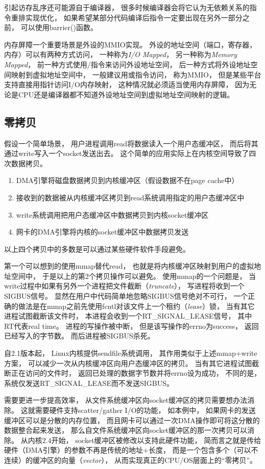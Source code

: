 \documentclass[11pt]{article}
\begin{document}
引起访存乱序还可能源自于编译器，
很多时候编译器会将它认为无依赖关系的指令重排实现优化，
如果希望某部分代码编译后指令一定要出现在另外一部分之前，
可以使用barrier()函数。

内存屏障一个重要场景是外设的MMIO实现。
外设的地址空间（端口，寄存器，内存）可以有两种方式访问，
一种称为{\em I/O Mapped}，
另一种称为{\em Memory Mapped}，
前一种方式使用/指令来访问外设地址空间，
后一种方式将外设地址空间映射到虚拟地址空间中，
一般建议用或指令访问，
称为MMIO，
但是某些平台支持直接用指针访问I/O内存映射，
这种情况就必须适当使用内存屏障，
因为无论是CPU还是编译器都不知道外设地址空间到虚拟地址空间映射的逻辑。

\subsection{零拷贝}
假设一个简单场景，
用户进程调用read将数据读入一个用户态缓冲区，
而后将其通过write写入一个socket发送出去。
这个简单的应用实际上在内核空间导致了四次数据拷贝。
\begin{enumerate}
  \item DMA引擎将磁盘数据拷贝到内核缓冲区（假设数据不在page cache中）
  \item 接收到的数据被从内核缓冲区拷贝到read系统调用指定的用户态缓冲区中
  \item write系统调用把用户态缓冲区中数据拷贝到内核socket缓冲区
  \item 网卡的DMA引擎将内核的socket缓冲区中数据拷贝发送
\end{enumerate}
以上四个拷贝中的多数是可以通过某些硬件软件手段避免。

第一个可以想到的使用mmap替代read，
也就是将内核缓冲区映射到用户的虚拟地址空间中，
于是以上的第2个拷贝操作可以避免。
使用mmap的一个问题是，
当write过程中如果有另外一个进程把文件截断（{\em truncate}），
写进程将收到一个SIGBUS信号。
显然在用户中代码简单地忽略SIGBUS信号绝对不可行，
一个正确的做法是在mmap之前先使用fcntl对该文件上一个租约（{\em lease}）锁，
当有其它进程试图截断该文件时，
本进程会收到一个RT\_SIGNAL\_LEASE信号，
其中RT代表real time。
进程的写操作被中断，
但是该写操作的errno为success，
返回已经写入的字节数。
而后进程被SIGBUS杀死。

自2.1版本起，
Linux内核提供sendfile系统调用，
其作用类似于上述mmap+write方案，
可以减少一次从内核缓冲区向用户态缓冲区的拷贝。
当有其它进程试图截断正在访问的文件时，
返回已处理的数据字节数并将errno设为成功，
不同的是，
系统仅发送RT\_SIGNAL\_LEASE而不发送SIGBUS。

需要更进一步提高效率，
从文件系统缓冲区向socket缓冲区的拷贝需要想办法消除。
这就需要硬件支持scatter/gather I/O的功能，
如本例中，
如果网卡的发送缓冲区可以是分散的内存位置，
而且网卡可以通过一次DMA操作即可将这分散的数据整合起来发送，
那么自文件系统缓冲区向socket缓冲区的那一次拷贝可以消除。
从内核2.4开始，
socket缓冲区被修改以支持此硬件功能，
简而言之就是传给硬件（DMA引擎）的参数不再是传统的地址+长度，
而是一个包含多个（可以不连续）的缓冲区的向量（{\em vector}），
从而实现真正的CPU/OS层面上的``零拷贝''。
\end{document}
